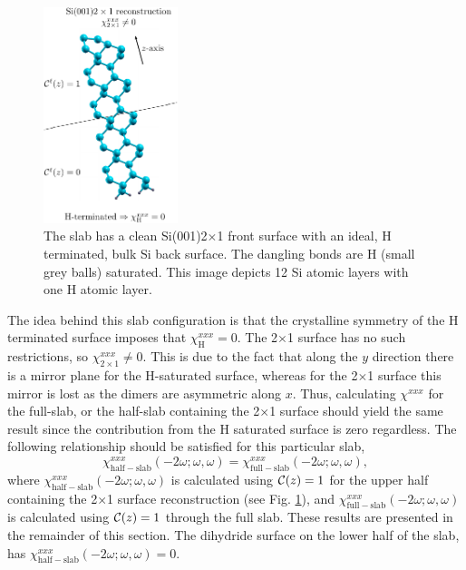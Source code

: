 \documentclass[11pt]{book}
\begin{document}
\begin{figure}
\centering 
\includegraphics[width=0.35\textwidth]{../figures/04-results/fig-4_1_01}
\caption{The slab has a clean Si(001)2$\times$1 front surface with an ideal, H
terminated, bulk Si back surface. The dangling bonds are H (small grey balls)
saturated. This image depicts 12 Si atomic layers with one H atomic layer.
\label{fig:si2x1}} 
\end{figure} 

The idea behind this slab configuration is that the crystalline symmetry of the
H terminated surface imposes that $\chi_{\mathrm{H}}^{xxx}=0$. The 2$\times$1
surface has no such restrictions, so $\chi_{2\times 1}^{xxx}\ne 0$. This is due
to the fact that along the $y$ direction there is a mirror plane for the
H-saturated surface, whereas for the 2$\times$1 surface this mirror is lost as
the dimers are asymmetric along $x$. Thus, calculating $\chi^{xxx}$ for the
full-slab, or the half-slab containing the 2$\times$1 surface \cite{note1}
should yield the same result since the contribution from the H saturated surface
is zero regardless. The following relationship should be satisfied for this
particular slab,
\begin{equation*}
\chi_{\mathrm{half-slab}}^{xxx}(-2\omega;\omega,\omega) =
\chi_{\mathrm{full-slab}}^{xxx}(-2\omega;\omega,\omega),
\end{equation*}
where $\chi_{\mathrm{half-slab}}^{xxx}(-2\omega;\omega,\omega)$ is calculated
using ${\mathbf{\cal C}}(z)=1$ for the upper half containing the 2$\times$1
surface reconstruction (see Fig. \ref{fig:si2x1}), and
$\chi_{\mathrm{full-slab}}^{xxx}(-2\omega;\omega,\omega)$ is calculated using
${\mathbf{\cal C}}(z)=1$ through the full slab. These results are presented in
the remainder of this section. The dihydride surface on the lower half of the
slab, has $\chi_{\mathrm{half-slab}}^{xxx}(-2\omega;\omega,\omega)=0$.
\end{document}
